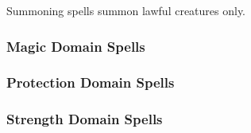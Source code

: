 \begin{spelllist}
    \SLcommand[1]
    \SLprotectionfromalignment[2]
    \SLholdperson[3]
    \SLorderswrath[3]
    \SLsummonmonsteriii[3]
    \SLcommandmass[4]
    \SLdiscernlies[4]
    \SLholdmonster[5]
    \SLprohibition[6]
    \SLdictum[6]
    \SLsummonmonstervi[6]
    \SLholdpersonmass[7]
    \SLimprisonment[8]
    \SLshieldoflaw[8]
    \SLholdmonstermass[9]
    \SLprohibition[9]
    \SLsummonmonsterix[9]
\end{spelllist}
Summoning spells summon lawful creatures only.

\subsubsection{Magic Domain Spells}

\begin{spelllist}
    \SLablativespellshield[1]
    \SLdimensionalanchor[3]
    \SLdispelmagic[3]
    \SLspellresistance[3]
    \SLspelltheft[5]
    \SLdispelmagicgreater[6]
    \SLantimagicfield[7]
    \SLspellturning[7]
    \SLspelltheftgreater[8]
    \SLdisjoinmagic[9]
\end{spelllist}

\subsubsection{Protection Domain Spells}

\begin{spelllist}
    \SLresistenergy[1]
    \SLsanctuary[1]
    \SLshieldoffaith[1]
    \SLsharepain[2]
    \SLdeathward[3]
    \SLresistenergygreater[3]
    \SLspellresistance[3]
    \SLstoneskin[4]
    \SLrepulsion[5]
    \SLspellturning[7]
    \SLenergyconversion[9]
\end{spelllist}

\subsubsection{Strength Domain Spells}

\begin{spelllist}
    \SLdivinefavor[1]
    \SLtotemicpower[2]
    \SLenlargeperson[3]
    \SLshout[3]
    \SLenlargemonster[4]
    \SLtotemicpowermass[4]
    \SLdivinefavorgreater[5]
    \SLtotemicpowergreater[5]
    \SLenlargepersonmass[6]
    \SLshoutgreater[6]
    \SLdivinemight[6]
    \SLenlargemonstermass[7]
    \SLironbody[8]
\end{spelllist}

